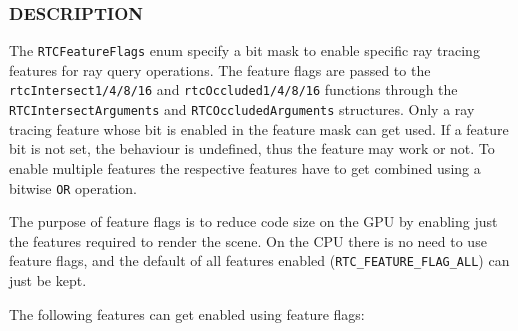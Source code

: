 \begin{Shaded}
\begin{Highlighting}[]
\OperatorTok{=}  \OperatorTok{\textless{}\textless{}} \OperatorTok{,}
\OperatorTok{=}  \OperatorTok{\textless{}\textless{}} \OperatorTok{,}
\OperatorTok{=}  \OperatorTok{,}

\OperatorTok{=}  \OperatorTok{\textless{}\textless{}} \OperatorTok{,}

\OperatorTok{=} 
\OperatorTok{\};}
\end{Highlighting}
\end{Shaded}

\subsubsection{DESCRIPTION}\label{description}

The \texttt{RTCFeatureFlags} enum specify a bit mask to enable specific
ray tracing features for ray query operations. The feature flags are
passed to the \texttt{rtcIntersect1/4/8/16} and
\texttt{rtcOccluded1/4/8/16} functions through the
\texttt{RTCIntersectArguments} and \texttt{RTCOccludedArguments}
structures. Only a ray tracing feature whose bit is enabled in the
feature mask can get used. If a feature bit is not set, the behaviour is
undefined, thus the feature may work or not. To enable multiple features
the respective features have to get combined using a bitwise \texttt{OR}
operation.

The purpose of feature flags is to reduce code size on the GPU by
enabling just the features required to render the scene. On the CPU
there is no need to use feature flags, and the default of all features
enabled (\texttt{RTC\_FEATURE\_FLAG\_ALL}) can just be kept.

The following features can get enabled using feature flags:

